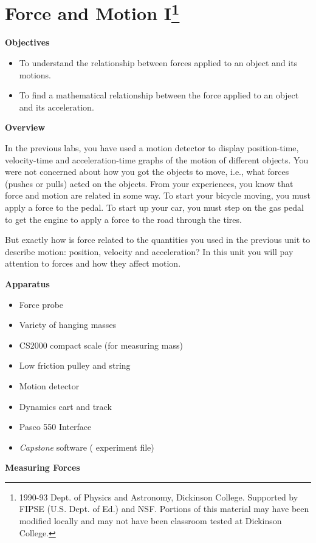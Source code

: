 
\section{Force and Motion I\footnote{
1990-93 Dept. of Physics and Astronomy, Dickinson College. Supported by FIPSE
(U.S. Dept. of Ed.) and NSF. Portions of this material may have been modified
locally and may not have been classroom tested at Dickinson College.
}}

\makelabheader %

\medskip
\textbf{Objectives }

\begin{itemize}[nosep]
\item To understand the relationship between forces applied to an object and its motions. 
\item To find a mathematical relationship between the force applied to an object and its acceleration.
\end{itemize}
\textbf{Overview }

In the previous labs, you have used a motion detector to display position-time,
velocity-time and acceleration-time graphs of the motion of different objects.
You were not concerned about how you got the objects to move, i.e., what forces
(pushes or pulls) acted on the objects. From your experiences, you know that
force and motion are related in some way. To start your bicycle moving, you
must apply a force to the pedal. To start up your car, you must step on the
gas pedal to get the engine to apply a force to the road through the tires.

But exactly how is force related to the quantities you used in the previous
unit to describe motion: position, velocity and acceleration? In this unit you
will pay attention to forces and how they affect motion. 

\medskip
\textbf{Apparatus} 

\begin{itemize} [nosep]
\item Force probe 
\item Variety of hanging masses 
\item CS2000 compact scale (for measuring mass)
\item Low friction pulley and string 
\item Motion detector 
\item Dynamics cart and track 
\item Pasco 550 Interface
\item \textit{Capstone} software ( experiment file)
\end{itemize}
\textbf{Measuring Forces} 

